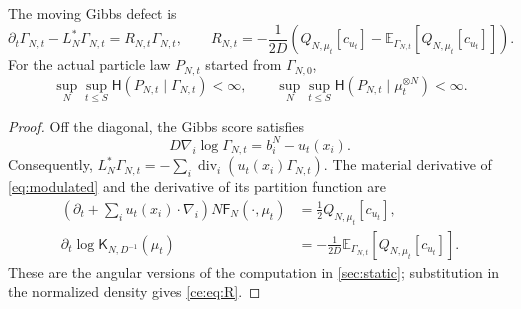 \documentclass[11pt,reqno]{amsart}
\numberwithin{equation}{section}
\theoremstyle{plain}
\theoremstyle{remark}
\newcommand{\E}{\mathbb E}\newcommand{\Q}{\mathbb Q}\newcommand{\Pb}{\mathbb P}
\newcommand{\K}{\mathsf K}\newcommand{\g}{\mathsf g}\newcommand{\Fr}{\mathsf F}
\newcommand{\Hr}{\mathsf H}\newcommand{\dd}{\,\mathrm d}
\DeclareMathOperator{\diver}{div}
\begin{document}
\begin{lemma}\label{ce:lem:globalentropy}
The moving Gibbs defect is
\begin{equation}\label{ce:eq:R}
 \partial_t\Gamma_{N,t}-L_N^*\Gamma_{N,t}=R_{N,t}\Gamma_{N,t},\qquad
 R_{N,t}=-\frac1{2D}\left(Q_{N,\mu_t}[c_{u_t}]
 -\E_{\Gamma_{N,t}}[Q_{N,\mu_t}[c_{u_t}]]\right).
\end{equation}
For the actual particle law $P_{N,t}$ started from $\Gamma_{N,0}$,
\begin{equation}\label{ce:eq:Hbounds}
 \sup_N\sup_{t\le S}\Hr(P_{N,t}\mid\Gamma_{N,t})<\infty,
 \qquad
 \sup_N\sup_{t\le S}\Hr(P_{N,t}\mid\mu_t^{\otimes N})<\infty.
\end{equation}
\end{lemma}
\begin{proof}
Off the diagonal, the Gibbs score satisfies
\begin{equation}\label{ce:eq:score}
 D\nabla_i\log\Gamma_{N,t}=b_i^N-u_t(x_i).
\end{equation}
Consequently, $L_N^*\Gamma_{N,t}=-\sum_i\diver_i(u_t(x_i)\Gamma_{N,t})$. The material derivative of \eqref{eq:modulated} and the derivative of its partition function are
\begin{align}
 \left(\partial_t+\sum_i u_t(x_i)\cdot\nabla_i\right)N\Fr_N(\cdot,\mu_t)
 &=\frac12Q_{N,\mu_t}[c_{u_t}],\label{ce:eq:angular-material-derivative}\\
 \partial_t\log\K_{N,D^{-1}}(\mu_t)
 &=-\frac1{2D}\E_{\Gamma_{N,t}}[Q_{N,\mu_t}[c_{u_t}]].\label{ce:eq:angular-normalizer-derivative}
\end{align}
These are the angular versions of the computation in \cref{sec:static}; substitution in the normalized density gives \eqref{ce:eq:R}.


\end{proof}
\end{document}
